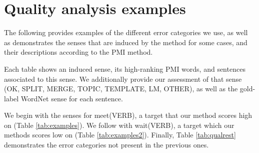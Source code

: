 \documentclass[11pt,a4paper]{article}
\begin{document}
\section{Quality analysis examples} 
\label{app:examples}
The following provides examples of the different error categories we use, as well as demonstrates the senses that are induced by the method for some cases, and their descriptions according to the PMI method.  

Each table shows an induced sense, its high-ranking PMI words, and sentences associated to this sense.
We additionally provide our assessment of that sense (OK, SPLIT, MERGE, TOPIC, TEMPLATE, LM, OTHER), as well as the gold-label WordNet sense for each sentence.

We begin with the senses for meet(VERB), a target that our method scores high on (Table \ref{tab:examples}).  
We follow with wait(VERB), a target which our methods scores low on (Table \ref{tab:examples2}).
Finally, Table \ref{tab:qualrest} demonstrates the error categories not present in the previous ones.  
\end{document}
